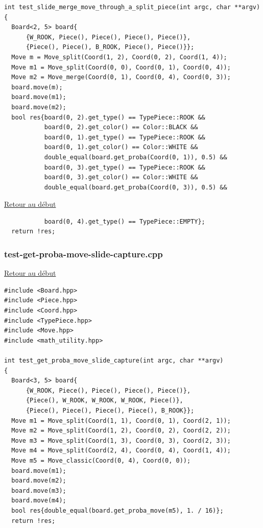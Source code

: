 {\begin{frame}[fragile]
\begin{verbatim}
int test_slide_merge_move_through_a_split_piece(int argc, char **argv)
{
  Board<2, 5> board{
      {W_ROOK, Piece(), Piece(), Piece(), Piece()},
      {Piece(), Piece(), B_ROOK, Piece(), Piece()}};
  Move m = Move_split(Coord(1, 2), Coord(0, 2), Coord(1, 4));
  Move m1 = Move_split(Coord(0, 0), Coord(0, 1), Coord(0, 4));
  Move m2 = Move_merge(Coord(0, 1), Coord(0, 4), Coord(0, 3));
  board.move(m);
  board.move(m1);
  board.move(m2);
  bool res{board(0, 2).get_type() == TypePiece::ROOK &&
           board(0, 2).get_color() == Color::BLACK &&
           board(0, 1).get_type() == TypePiece::ROOK &&
           board(0, 1).get_color() == Color::WHITE &&
           double_equal(board.get_proba(Coord(0, 1)), 0.5) &&
           board(0, 3).get_type() == TypePiece::ROOK &&
           board(0, 3).get_color() == Color::WHITE &&
           double_equal(board.get_proba(Coord(0, 3)), 0.5) &&
\end{verbatim}
\end{frame}

\begin{frame}[fragile]
\hyperlink{conclusion}{Retour au début}\newline
\begin{verbatim}
           board(0, 4).get_type() == TypePiece::EMPTY};
  return !res;

\end{verbatim}
\end{frame}

\begin{frame}[fragile]
\label{testgetprobamoveslidecapture.cpp}
\frametitle{test-get-proba-move-slide-capture.cpp}
\hyperlink{conclusion}{Retour au début}\newline
\begin{verbatim}
#include <Board.hpp>
#include <Piece.hpp>
#include <Coord.hpp>
#include <TypePiece.hpp>
#include <Move.hpp>
#include <math_utility.hpp>

int test_get_proba_move_slide_capture(int argc, char **argv)
{
  Board<3, 5> board{
      {W_ROOK, Piece(), Piece(), Piece(), Piece()},
      {Piece(), W_ROOK, W_ROOK, W_ROOK, Piece()},
      {Piece(), Piece(), Piece(), Piece(), B_ROOK}};
  Move m1 = Move_split(Coord(1, 1), Coord(0, 1), Coord(2, 1));
  Move m2 = Move_split(Coord(1, 2), Coord(0, 2), Coord(2, 2));
  Move m3 = Move_split(Coord(1, 3), Coord(0, 3), Coord(2, 3));
  Move m4 = Move_split(Coord(2, 4), Coord(0, 4), Coord(1, 4));
  Move m5 = Move_classic(Coord(0, 4), Coord(0, 0));
  board.move(m1);
  board.move(m2);
  board.move(m3);
  board.move(m4);
  bool res{double_equal(board.get_proba_move(m5), 1. / 16)};
  return !res;


\end{verbatim}
\end{frame}}
